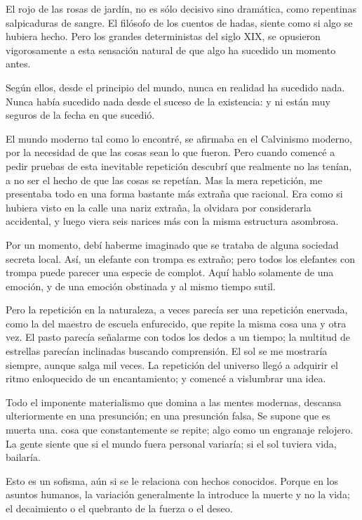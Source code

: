 El rojo de las rosas de jardín, no es sólo decisivo sino dramática, como repentinas salpicaduras de
sangre. El filósofo de los cuentos de hadas, siente como si algo se hubiera hecho. Pero los grandes
deterministas del siglo XIX, se opusieron vigorosamente a esta sensación natural de que algo ha sucedido
un momento antes.

Según ellos, desde el principio del mundo, nunca en realidad ha sucedido nada. Nunca había
sucedido nada desde el suceso de la existencia: y ni están muy seguros de la fecha en que sucedió.

El mundo moderno tal como lo encontré, se afirmaba en el Calvinismo moderno, por la necesidad
de que las cosas sean lo que fueron. Pero cuando comencé a pedir pruebas de esta inevitable repetición
descubrí que realmente no las tenían, a no ser el hecho de que las cosas se repetían. Mas la mera
repetición, me presentaba todo en una forma bastante más extraña que racional. Era como si hubiera visto
en la calle una nariz extraña, la olvidara por considerarla accidental, y luego viera seis narices más con la
misma estructura asombrosa.

Por un momento, debí haberme imaginado que se trataba de alguna sociedad secreta local. Así, un
elefante con trompa es extraño; pero todos los elefantes con trompa puede parecer una especie de
complot. Aquí hablo solamente de una emoción, y de una emoción obstinada y al mismo tiempo sutil.

Pero la repetición en la naturaleza, a veces parecía ser una repetición enervada, como la del maestro de
escuela enfurecido, que repite la misma cosa una y otra vez. El pasto parecía señalarme con todos los
dedos a un tiempo; la multitud de estrellas parecían inclinadas buscando comprensión. El sol se me
mostraría siempre, aunque salga mil veces. La repetición del universo llegó a adquirir el ritmo
enloquecido de un encantamiento; y comencé a vislumbrar una idea.

Todo el imponente materialismo que domina a las mentes modernas, descansa ulteriormente en una
presunción; en una presunción falsa, Se supone que es muerta una. cosa que constantemente se repite;
algo como un engranaje relojero. La gente siente que si el mundo fuera personal variaría; si el sol tuviera
vida, bailaría.

Esto es un sofisma, aún si se le relaciona con hechos conocidos. Porque en los asuntos humanos, la
variación generalmente la introduce la muerte y no la vida; el decaimiento o el quebranto de la fuerza o el
deseo.

